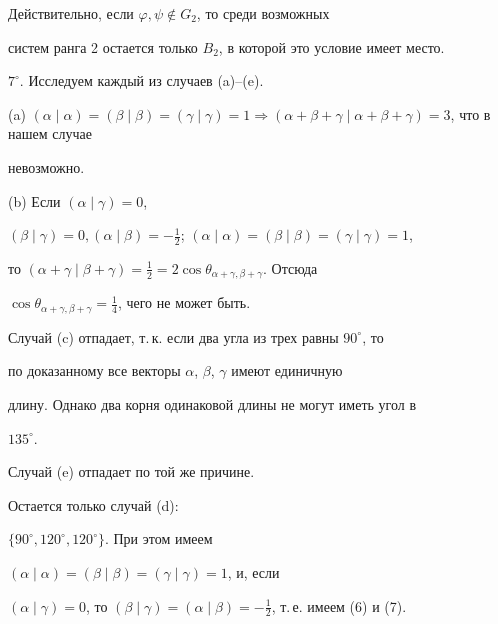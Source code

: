 \begin{pf}
Действительно, если $\varphi,\psi\notin G_2$, то среди возможных


систем ранга 2 остается только $B_2$, в которой это условие имеет место.





$7^\circ$. Исследуем каждый из случаев (a)--(e).





(a) $(\alpha\mid \alpha)=(\beta\mid \beta)=(\gamma\mid \gamma)=1\Rightarrow


(\alpha+\beta+\gamma\mid \alpha+\beta+\gamma)=3$, что в нашем случае


невозможно.





(b) Если $(\alpha\mid \gamma )=0$,


$(\beta \mid \gamma )=0,(\alpha \mid \beta )


=-\frac{1}{2}$; $(\alpha \mid \alpha )=


(\beta \mid \beta )=(\gamma \mid \gamma )=1$,


то $(\alpha +\gamma \mid \beta +\gamma )=\frac{1}{2}=2\cos 


\theta_{\alpha+\gamma,\beta+\gamma}$. Отсюда


$\cos\theta_{\alpha+\gamma,\beta+\gamma}=\frac14$, чего не может быть.





Случай (c) отпадает, т.\,к. если два угла из трех равны $90^\circ$, то


по доказанному все векторы $\alpha$, $\beta$, $\gamma$ имеют единичную


длину. Однако два корня одинаковой длины не могут иметь угол в


$135^\circ$.





Случай (e) отпадает по той же причине.





Остается только случай (d):


$\{90^\circ,120^\circ,120^\circ\}$. При этом имеем


$(\alpha \mid \alpha )=(\beta \mid \beta )=(\gamma \mid \gamma )=1$, и, если


$(\alpha \mid \gamma )=0$, то $(\beta \mid \gamma )=(\alpha \mid \beta )=


-\frac{1}{2}$, т.\,е. имеем (6) и (7).






\end{pf}
